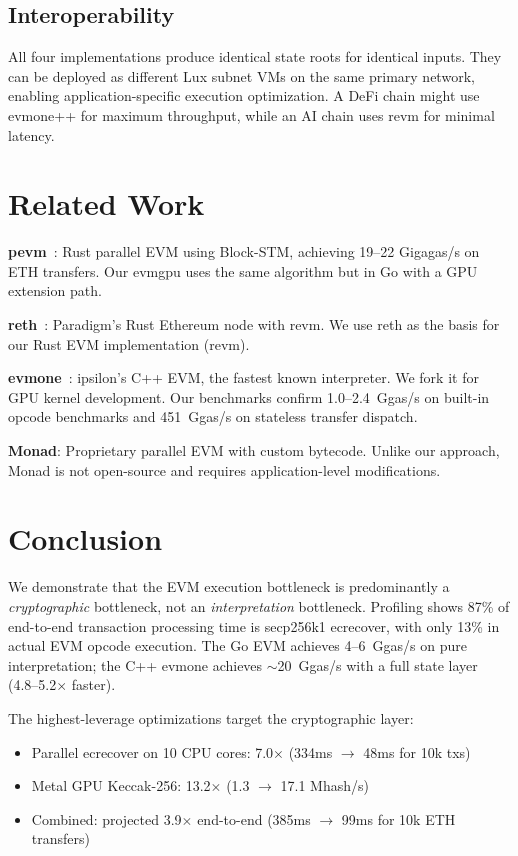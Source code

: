 \documentclass[11pt,twocolumn]{article}
\begin{document}
\subsection{Interoperability}

All four implementations produce identical state roots for identical inputs.
They can be deployed as different Lux subnet VMs on the same primary network,
enabling application-specific execution optimization. A DeFi chain might use
evmone++ for maximum throughput, while an AI chain uses revm for minimal latency.

\section{Related Work}

\textbf{pevm}~\cite{pevm}: Rust parallel EVM using Block-STM, achieving 19--22 Gigagas/s
on ETH transfers. Our evmgpu uses the same algorithm but in Go with a GPU extension path.

\textbf{reth}~\cite{reth}: Paradigm's Rust Ethereum node with revm. We use reth as
the basis for our Rust EVM implementation (revm).

\textbf{evmone}~\cite{evmone}: ipsilon's C++ EVM, the fastest known interpreter.
We fork it for GPU kernel development. Our benchmarks confirm 1.0--2.4~Ggas/s
on built-in opcode benchmarks and 451~Ggas/s on stateless transfer dispatch.

\textbf{Monad}: Proprietary parallel EVM with custom bytecode. Unlike our approach,
Monad is not open-source and requires application-level modifications.

\section{Conclusion}

We demonstrate that the EVM execution bottleneck is predominantly a \emph{cryptographic}
bottleneck, not an \emph{interpretation} bottleneck. Profiling shows 87\% of end-to-end
transaction processing time is secp256k1 ecrecover, with only 13\% in actual EVM
opcode execution. The Go EVM achieves 4--6~Ggas/s on pure interpretation; the C++
evmone achieves $\sim$20~Ggas/s with a full state layer (4.8--5.2$\times$ faster).

The highest-leverage optimizations target the cryptographic layer:
\begin{itemize}
\item Parallel ecrecover on 10 CPU cores: 7.0$\times$ (334ms $\to$ 48ms for 10k txs)
\item Metal GPU Keccak-256: 13.2$\times$ (1.3 $\to$ 17.1 Mhash/s)
\item Combined: projected 3.9$\times$ end-to-end (385ms $\to$ 99ms for 10k ETH transfers)
\end{itemize}
\end{document}
